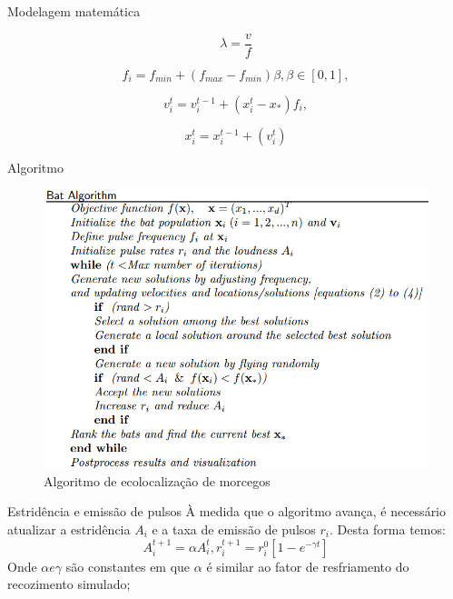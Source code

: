 \documentclass{beamer}
\begin{document}
  \begin{frame}{Modelagem matemática}

      \begin{equation}
          \lambda = \dfrac{v}{f}
      \end{equation}

      \begin{equation}
          f_i= f_{min} + (f_{max} - f_{min})\beta, \beta \in [0,1],
      \end{equation}

      \begin{equation}
          v^{t}_i = v^{t-1}_i + (x^{t}_i - x_*)f_i,
      \end{equation}

      \begin{equation}
          x^{t}_i = x^{t-1}_i + (v^{t}_i)
      \end{equation}

  \end{frame}


  \begin{frame}{Algoritmo}
      \begin{figure}
          \centering
          \includegraphics[width=1.0\textwidth]{algoritmo-bat.png}
          \caption{Algoritmo de ecolocalização de morcegos \cite{bat}}
      \end{figure}
  \end{frame}

  \begin{frame}{Estridência e emissão de pulsos}
      À medida que o algoritmo avança, é necessário atualizar a estridência $A_i$ e a taxa de emissão de pulsos $r_i$. Desta forma temos:
      \begin{equation}
          A^{t+1}_i = \alpha A^{t}_i, r^{t+1}_i = r^{0}_i[1 - e^{-\gamma t}]
      \end{equation}
      Onde $\alpha e \gamma$ são constantes em que $\alpha$ é similar ao fator de resfriamento do recozimento simulado;
  \end{frame}
\end{document}
